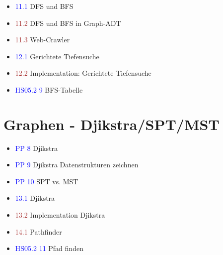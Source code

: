 \documentclass[a4paper,12pt]{article}
\newcommand{\ub}[1]{\textcolor{blue}{#1}}
\newcommand{\ubc}[1]{\textcolor{brown}{#1}}
\begin{document}
\begin{itemize}
  \item \ub{11.1} DFS und BFS
  \item \ubc{11.2} DFS und BFS in Graph-ADT
  \item \ubc{11.3} Web-Crawler
  \item \ub{12.1} Gerichtete Tiefensuche
  \item \ubc{12.2} Implementation: Gerichtete Tiefensuche
  \item \ub{HS05.2 9} BFS-Tabelle
\end{itemize}

\section{Graphen - Djikstra/SPT/MST}

\begin{itemize}
  \item \ub{PP 8} Djikstra
  \item \ub{PP 9} Djikstra Datenstrukturen zeichnen
  \item \ub{PP 10} SPT vs. MST
  \item \ub{13.1} Djikstra
  \item \ubc{13.2} Implementation Djikstra
  \item \ubc{14.1} Pathfinder
  \item \ub{HS05.2 11} Pfad finden
\end{itemize}
\end{document}
